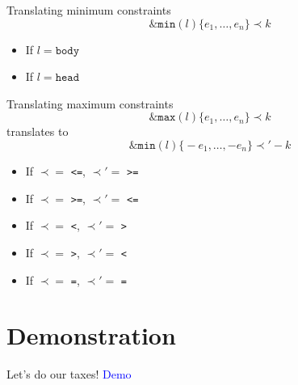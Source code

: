 \documentclass[11pt]{beamer}
\begin{document}
\begin{frame}{Translating minimum constraints}
\[\mathtt{\&min}(l)\mathtt{\{}e_1,\dots,e_n\mathtt{\}} \prec k\]
\pause
 \begin{itemize}
    \item If $l=\mathtt{body}$
    
    \pause
    \item If $l=\mathtt{head}$
    
 \end{itemize}
\end{frame}

\begin{frame}{Translating maximum constraints}
\[\mathtt{\&max}(l)\mathtt{\{}e_1,\dots,e_n\mathtt{\}} \prec k\]
translates to
\[\mathtt{\&min}(l)\mathtt{\{}-e_1,\dots,-e_n\mathtt{\}} \prec' -k\]
 \begin{itemize}
    \item If $\prec=$ \texttt{<=}, $\prec'=$ \texttt{>=}
    \item If $\prec=$ \texttt{>=}, $\prec'=$ \texttt{<=}
    \item If $\prec=$ \texttt{<}, $\prec'=$ \texttt{>}
    \item If $\prec=$ \texttt{>}, $\prec'=$ \texttt{<}
    \item If $\prec=$ \texttt{=}, $\prec'=$ \texttt{=}
 \end{itemize}
\end{frame}

\section{Demonstration}
\begin{frame}{Let's do our taxes!}
  \huge\centering\textcolor{blue}{Demo}
\end{frame}
\end{document}
